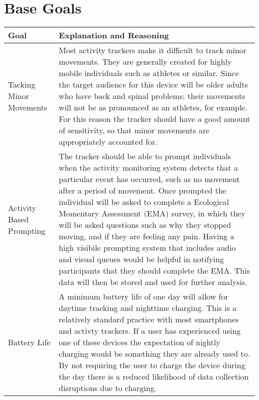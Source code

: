 \documentclass{article}
\begin{document}
\section{Base Goals}
\begin{center}
    \begin{tabular}{ | m{7em} | m{32em}| }
        \hline
        \textbf{Goal}                                    & \textbf{Explanation and Reasoning}                                                                                                                                                                                                                                                                                                                                                                                                                                                                                                                                                               \\
        \hline
        Tacking Minor Movements                          & Most activity trackers make it difficult to track minor movements.
        They are generally created for highly mobile individuals such as athletes or similar. Since the target audience for this device will be older adults who have back and spinal problems; their movements will not be as pronounced as an athletes, for example. For this reason the tracker should have a good amount of sensitivity, so that minor movements are appropriately accounted for.                                                                                                                                                                                                                                                       \\
        \hline
        Activity Based Prompting                            & The tracker should be able to prompt individuals when the activity monitoring system detects that a particular event has occurred, such as no movement after a period of movement.  Once prompted the individual will be asked to complete a Ecological Momentary Assessment (EMA) survey, in which they will be asked questions such as why they stopped moving, and if they are feeling any pain. Having a high visibile prompting system that includes audio and visual queues would be helpful in notifying participants that they should complete the EMA. This data will then be stored and used for further analysis. \\
        \hline
        Battery Life                                     & A minimum battery life of one day will allow for daytime tracking and nighttime charging. This is a relatively standard practice with most smartphones and activty trackers. If a user has experienced using one of these devices the expectation of nightly charging would be something they are already used to. By not requiring the user to charge the device during the day there is a reduced likelihood of data collection disruptions due to charging.                                                                                                                                   \\

\end{tabular}
\end{center}
\end{document}
